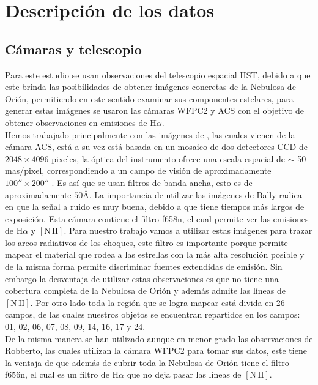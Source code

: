\documentclass{article}
\newcommand\ha{\ensuremath{\mathrm{H}\alpha}}
\newcommand\nii{\ensuremath{\mathrm{[N\,II]}}}
\begin{document}
\section{Descripción de los datos}
\label{sec:descripcion}

\subsection{Cámaras y telescopio}
\label{sec:camara}

Para este estudio se usan observaciones del telescopio espacial HST, debido a que este brinda las posibilidades de obtener imágenes concretas de la Nebulosa de Orión, permitiendo en este sentido examinar sus componentes estelares, para generar estas imágenes se usaron las cámaras  WFPC2 y ACS con el objetivo de obtener observaciones en emisiones de \ha{}.\\

Hemos trabajado principalmente con las imágenes de \citet{Bally:2006a}, las cuales vienen de la cámara ACS, está a su vez está basada en un mosaico de dos detectores CCD de \(2048 \times 4096\) pixeles, la óptica del instrumento ofrece una escala espacial de \(\sim\) 50 mas/pixel, correspondiendo a un campo de visión de aproximadamente \(100'' \times 200'' \) \citep{Robberto:2013a}. Es así que se usan filtros de banda ancha, esto es de aproximadamente \(50 \text{Å}\). La importancia de utilizar las imágenes de Bally radica en que la señal a ruido es muy buena, debido a que tiene tiempos más largos de exposición. Esta cámara contiene el filtro f658n, el cual permite ver las emisiones de \ha{} y \nii{}. Para nuestro trabajo vamos a utilizar estas imágenes para trazar los arcos radiativos de los choques, este filtro es importante porque permite mapear el material que rodea a las estrellas con la más alta resolución posible y de la misma forma permite discriminar fuentes extendidas de emisión. Sin embargo la desventaja de utilizar estas observaciones es que no tiene una cobertura completa de la Nebulosa de Orión y además admite las líneas de \nii{}. Por otro lado toda la región que se logra mapear está divida en 26 campos, de las cuales nuestros objetos se encuentran repartidos en los campos: 01, 02, 06, 07, 08, 09, 14, 16, 17 y 24.\\

De la misma manera se han utilizado aunque en menor grado las observaciones de Robberto, las cuales utilizan la cámara WFPC2 para tomar sus datos, este tiene la ventaja de que además de cubrir toda la Nebulosa de Orión tiene el filtro f656n, el cual es un filtro de \ha{} que no deja pasar las líneas de  \nii{}.\\ 
\end{document}
